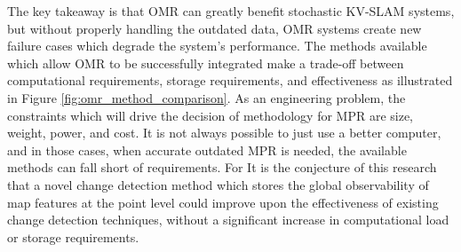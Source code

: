 The key takeaway is that OMR can greatly benefit stochastic KV-SLAM systems, but without properly handling the outdated data, OMR systems create new failure cases which degrade the system's performance. The methods available which allow OMR to be successfully integrated make a trade-off between computational requirements, storage requirements, and effectiveness as illustrated in Figure \ref{fig:omr_method_comparison}. As an engineering problem, the constraints which will drive the decision of methodology for MPR are size, weight, power, and cost. It is not always possible to just use a better computer, and in those cases, when accurate outdated MPR is needed, the available methods can fall short of requirements. For  It is the conjecture of this research that a novel change detection method which stores the global observability of map features at the point level could improve upon the effectiveness of existing change detection techniques, without a significant increase in computational load or storage requirements.